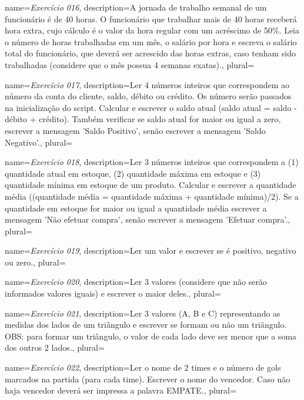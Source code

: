 {
	name={\textit{Exercício 016}},
	description={A jornada de trabalho semanal de um funcionário é de 40 horas. O funcionário que trabalhar mais de 40 horas receberá hora extra, cujo cálculo é o valor da hora regular com um acréscimo de 50\%. Leia o número de horas trabalhadas em um mês, o salário por hora e escreva o salário total do funcionário, que deverá ser acrescido das horas extras, caso tenham sido trabalhadas (considere que o mês possua 4 semanas exatas).},
	plural={}
}



{
	name={\textit{Exercício 017}},
	description={Ler 4 números inteiros que correspondem ao número da conta do cliente, saldo, débito ou crédito. Os número serão passados na inicialização do script. Calcular e escrever o saldo atual (saldo atual = saldo - débito + crédito). Também verificar se saldo atual for maior ou igual a zero, escrever a mensagem 'Saldo Positivo', senão escrever a mensagem 'Saldo Negativo'.},
	plural={}
}


{
	name={\textit{Exercício 018}},
	description={Ler 3 números inteiros que correspondem a (1) quantidade atual em estoque, (2) quantidade máxima em estoque e (3) quantidade mínima em estoque de um produto. Calcular e escrever a quantidade média ((quantidade média = quantidade máxima + quantidade mínima)/2). Se a quantidade em estoque for maior ou igual a quantidade média escrever a mensagem 'Não efetuar compra', senão escrever a mensagem 'Efetuar compra'.},
	plural={}
}



{
	name={\textit{Exercício 019}},
	description={Ler um valor e escrever se é positivo, negativo ou zero.},
	plural={}
}



{
	name={\textit{Exercício 020}},
	description={Ler 3 valores (considere que não serão informados valores iguais) e escrever o maior deles.},
	plural={}
}


{
	name={\textit{Exercício 021}},
	description={Ler 3 valores (A, B e C) representando as medidas dos lados de um triângulo e escrever se formam ou não um triângulo. OBS: para formar um triângulo, o valor de cada lado deve ser menor que a soma dos outros 2 lados.},
	plural={}
}


{
	name={\textit{Exercício 022}},
	description={Ler o nome de 2 times e o número de gols marcados na partida (para cada time). Escrever o nome do vencedor. Caso não haja vencedor deverá ser impressa a palavra EMPATE.},
	plural={}
}


